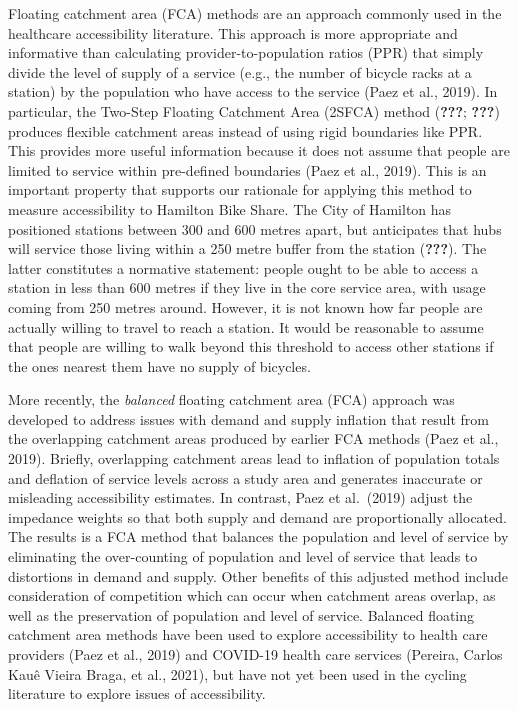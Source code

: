 \documentclass[]{elsarticle} %
\begin{document}
Floating catchment area (FCA) methods are an approach commonly used in
the healthcare accessibility literature. This approach is more
appropriate and informative than calculating provider-to-population
ratios (PPR) that simply divide the level of supply of a service (e.g.,
the number of bicycle racks at a station) by the population who have
access to the service (Paez et al., 2019). In particular, the Two-Step
Floating Catchment Area (2SFCA) method ({\textbf{???}}; {\textbf{???}})
produces flexible catchment areas instead of using rigid boundaries like
PPR. This provides more useful information because it does not assume
that people are limited to service within pre-defined boundaries (Paez
et al., 2019). This is an important property that supports our rationale
for applying this method to measure accessibility to Hamilton Bike
Share. The City of Hamilton has positioned stations between 300 and 600
metres apart, but anticipates that hubs will service those living within
a 250 metre buffer from the station ({\textbf{???}}). The latter
constitutes a normative statement: people ought to be able to access a
station in less than 600 metres if they live in the core service area,
with usage coming from 250 metres around. However, it is not known how
far people are actually willing to travel to reach a station. It would
be reasonable to assume that people are willing to walk beyond this
threshold to access other stations if the ones nearest them have no
supply of bicycles.

More recently, the \emph{balanced} floating catchment area (FCA)
approach was developed to address issues with demand and supply
inflation that result from the overlapping catchment areas produced by
earlier FCA methods (Paez et al., 2019). Briefly, overlapping catchment
areas lead to inflation of population totals and deflation of service
levels across a study area and generates inaccurate or misleading
accessibility estimates. In contrast, Paez et al.~(2019) adjust the
impedance weights so that both supply and demand are proportionally
allocated. The results is a FCA method that balances the population and
level of service by eliminating the over-counting of population and
level of service that leads to distortions in demand and supply. Other
benefits of this adjusted method include consideration of competition
which can occur when catchment areas overlap, as well as the
preservation of population and level of service. Balanced floating
catchment area methods have been used to explore accessibility to health
care providers (Paez et al., 2019) and COVID-19 health care services
(Pereira, Carlos Kauê Vieira Braga, et al., 2021), but have not yet been
used in the cycling literature to explore issues of accessibility.
\end{document}
